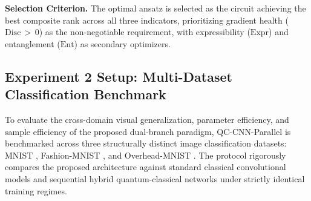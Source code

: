 \documentclass[journal]{IEEEtran}
\begin{document}
\textbf{Selection Criterion.} The optimal ansatz is selected as the circuit achieving the best composite rank across all three indicators, prioritizing gradient health ($\mathrm{Disc} \,{>}\, 0$) as the non-negotiable requirement, with expressibility ($\mathrm{Expr}$) and entanglement ($\mathrm{Ent}$) as secondary optimizers.

\subsection{Experiment 2 Setup: Multi-Dataset Classification Benchmark}
\label{subsec:exp2_setup}
To evaluate the cross-domain visual generalization, parameter efficiency, and sample efficiency of the proposed dual-branch paradigm, QC-CNN-Parallel is benchmarked across three structurally distinct image classification datasets: MNIST \cite{lecun1998gradient}, Fashion-MNIST \cite{xiao2017fashion}, and Overhead-MNIST \cite{liu2026parallel}. The protocol rigorously compares the proposed architecture against standard classical convolutional models and sequential hybrid quantum-classical networks under strictly identical training regimes.
\end{document}

